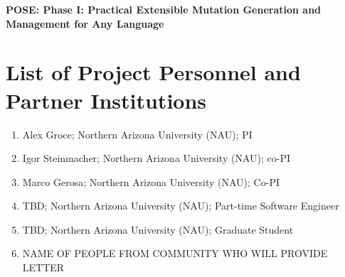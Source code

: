 \documentclass[12pt]{article}
\begin{document}
\begin{center}
{\Large\sf\textbf{POSE: Phase I: Practical Extensible Mutation Generation and Management for Any Language}}
\end{center}

\section*{List of Project Personnel and Partner Institutions}

\begin{enumerate}
  \item Alex Groce;  Northern Arizona University (NAU); PI
  \item Igor Steinmacher; Northern Arizona University (NAU); co-PI
  \item Marco Gerosa; Northern Arizona University (NAU); Co-PI
  \item TBD; Northern Arizona University (NAU); Part-time Software Engineer
  \item TBD; Northern Arizona University (NAU); Graduate Student
  \item NAME OF PEOPLE FROM COMMUNITY WHO WILL PROVIDE LETTER
\end{enumerate}
\end{document}
